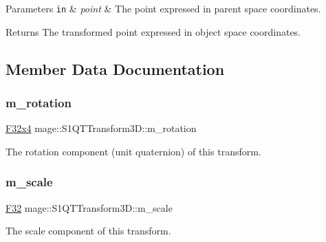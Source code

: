 \begin{DoxyParams}[1]{Parameters}
\mbox{\tt in}  & {\em point} & The point expressed in parent space coordinates. \\
\hline
\end{DoxyParams}
\begin{DoxyReturn}{Returns}
The transformed point expressed in object space coordinates. 
\end{DoxyReturn}


\subsection{Member Data Documentation}
\mbox{\label{classmage_1_1_s1_q_t_transform3_d_af21d33f5abb6454a3eeb91c9503c8f78}} 
\subsubsection{\texorpdfstring{m\+\_\+rotation}{m\_rotation}}
{\footnotesize\ttfamily \mbox{\hyperlink{namespacemage_a851648f37dfb126a2d2f973e102861ad}{F32x4}} mage\+::\+S1\+Q\+T\+Transform3\+D\+::m\+\_\+rotation\hspace{0.3cm}{\ttfamily [private]}}

The rotation component (unit quaternion) of this transform. \mbox{\label{classmage_1_1_s1_q_t_transform3_d_ae1e71daf3e9c4b860d33735f8613a0e6}} 
\subsubsection{\texorpdfstring{m\+\_\+scale}{m\_scale}}
{\footnotesize\ttfamily \mbox{\hyperlink{namespacemage_aa97e833b45f06d60a0a9c4fc22ae02c0}{F32}} mage\+::\+S1\+Q\+T\+Transform3\+D\+::m\+\_\+scale\hspace{0.3cm}{\ttfamily [private]}}

The scale component of this transform. \mbox{\label{classmage_1_1_s1_q_t_transform3_d_ac5a9eb3e71ae8911143c431e672eb094}} 
